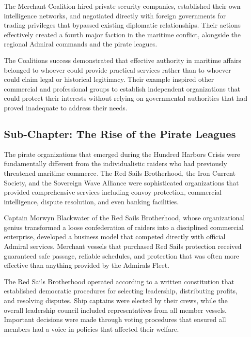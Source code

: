 The Merchant Coalition hired private security companies, established
their own intelligence networks, and negotiated directly with foreign
governments for trading privileges that bypassed existing diplomatic
relationships. Their actions effectively created a fourth major faction
in the maritime conflict, alongside the regional Admiral commands and
the pirate leagues.

The Coalition\textquotesingle s success demonstrated that effective
authority in maritime affairs belonged to whoever could provide
practical services rather than to whoever could claim legal or
historical legitimacy. Their example inspired other commercial and
professional groups to establish independent organizations that could
protect their interests without relying on governmental authorities that
had proved inadequate to address their needs.

\subsection{Sub-Chapter: The Rise of the Pirate
Leagues}\label{sub-chapter-the-rise-of-the-pirate-leagues}

The pirate organizations that emerged during the Hundred Harbors Crisis
were fundamentally different from the individualistic raiders who had
previously threatened maritime commerce. The Red Sails Brotherhood, the
Iron Current Society, and the Sovereign Wave Alliance were sophisticated
organizations that provided comprehensive services including convoy
protection, commercial intelligence, dispute resolution, and even
banking facilities.

Captain Morwyn Blackwater of the Red Sails Brotherhood, whose
organizational genius transformed a loose confederation of raiders into
a disciplined commercial enterprise, developed a business model that
competed directly with official Admiral services. Merchant vessels that
purchased Red Sails protection received guaranteed safe passage,
reliable schedules, and protection that was often more effective than
anything provided by the Admiral\textquotesingle s Fleet.

The Red Sails Brotherhood operated according to a written constitution
that established democratic procedures for selecting leadership,
distributing profits, and resolving disputes. Ship captains were elected
by their crews, while the overall leadership council included
representatives from all member vessels. Important decisions were made
through voting procedures that ensured all members had a voice in
policies that affected their welfare.

